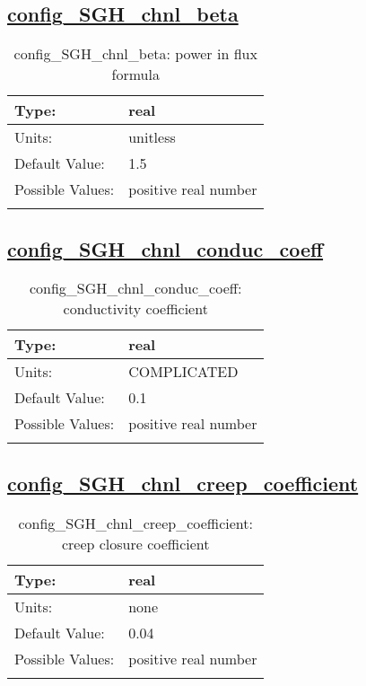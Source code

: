 \subsection[config\_SGH\_chnl\_beta]{\hyperref[sec:nm_tab_subglacial_hydro]{config\_SGH\_chnl\_beta}}
\label{subsec:nm_sec_config_SGH_chnl_beta}
\begin{center}
\begin{longtable}{| p{2.0in} || p{4.0in} |}
    \hline
    Type: & real \\
    \hline
    Units: & \si{unitless} \\
    \hline
    Default Value: & 1.5 \\
    \hline
    Possible Values: & positive real number \\
    \hline
    \caption{config\_SGH\_chnl\_beta: power in flux formula}
\end{longtable}
\end{center}
\subsection[config\_SGH\_chnl\_conduc\_coeff]{\hyperref[sec:nm_tab_subglacial_hydro]{config\_SGH\_chnl\_conduc\_coeff}}
\label{subsec:nm_sec_config_SGH_chnl_conduc_coeff}
\begin{center}
\begin{longtable}{| p{2.0in} || p{4.0in} |}
    \hline
    Type: & real \\
    \hline
    Units: & \si{COMPLICATED} \\
    \hline
    Default Value: & 0.1 \\
    \hline
    Possible Values: & positive real number \\
    \hline
    \caption{config\_SGH\_chnl\_conduc\_coeff: conductivity coefficient}
\end{longtable}
\end{center}
\subsection[config\_SGH\_chnl\_creep\_coefficient]{\hyperref[sec:nm_tab_subglacial_hydro]{config\_SGH\_chnl\_creep\_coefficient}}
\label{subsec:nm_sec_config_SGH_chnl_creep_coefficient}
\begin{center}
\begin{longtable}{| p{2.0in} || p{4.0in} |}
    \hline
    Type: & real \\
    \hline
    Units: & \si{none} \\
    \hline
    Default Value: & 0.04 \\
    \hline
    Possible Values: & positive real number \\
    \hline
    \caption{config\_SGH\_chnl\_creep\_coefficient: creep closure coefficient}
\end{longtable}
\end{center}
